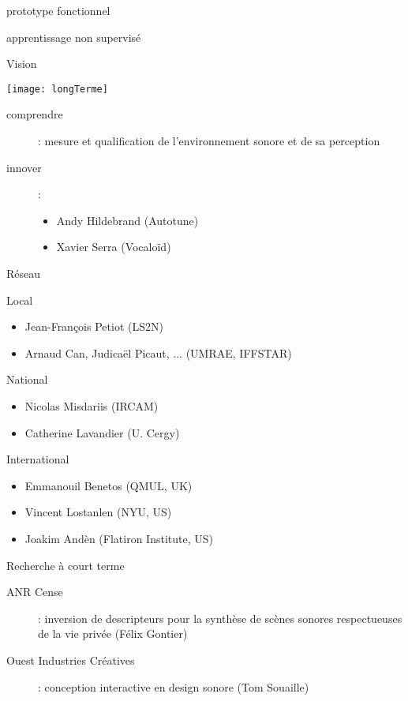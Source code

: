 prototype fonctionnel

apprentissage non supervisé

\begin{frame}{Vision}
\begin{center}
 \texttt{[image: longTerme]}
\end{center}
\begin{description}
\item[comprendre] : mesure et qualification de l'environnement sonore et de sa perception
\item[innover] : 
\begin{itemize}
\item Andy Hildebrand (Autotune)
\item Xavier Serra (Vocaloïd)
\end{itemize}
\end{description}
\end{frame}

\begin{frame}{Réseau}
\begin{block}{Local}
\begin{itemize}
\item Jean-François Petiot (LS2N)
\item Arnaud Can, Judicaël Picaut, ... (UMRAE, IFFSTAR)
\end{itemize}
\end{block}
\begin{block}{National}
\begin{itemize}
\item Nicolas Misdariis (IRCAM)
\item Catherine Lavandier (U. Cergy)
\end{itemize}
\end{block}
\begin{block}{International}
\begin{itemize}
\item Emmanouil Benetos (QMUL, UK)
\item Vincent Lostanlen (NYU, US)
\item Joakim Andèn (Flatiron Institute, US)
\end{itemize}
\end{block}
\end{frame}

\begin{frame}{Recherche à court terme}
\begin{description}
\item[ANR Cense]: inversion de descripteurs pour la synthèse de scènes sonores respectueuses de la vie privée (Félix Gontier)
\item[Ouest Industries Créatives]: conception interactive en design sonore (Tom Souaille)
\end{description}
\end{frame}

